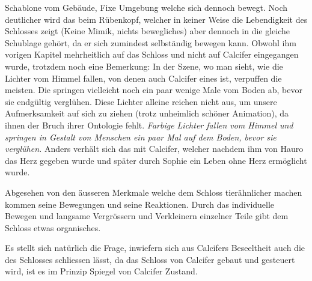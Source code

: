 Schablone vom Gebäude, Fixe Umgebung welche sich dennoch bewegt. Noch deutlicher wird das beim Rübenkopf, welcher in keiner Weise die Lebendigkeit des Schlosses zeigt (Keine Mimik, nichts bewegliches) aber dennoch in die gleiche Schublage gehört, da er sich zumindest selbständig bewegen kann.
Obwohl ihm vorigen Kapitel mehrheitlich auf das Schloss und nicht auf Calcifer eingegangen wurde, trotzdem noch eine Bemerkung: In der Szene, wo man sieht, wie die Lichter vom Himmel fallen, von denen auch Calcifer eines ist, verpuffen die meisten. Die springen vielleicht noch ein paar wenige Male vom Boden ab, bevor sie endgültig verglühen. Diese Lichter alleine reichen nicht aus, um unsere Aufmerksamkeit auf sich zu ziehen (trotz unheimlich schöner Animation), da ihnen der Bruch ihrer Ontologie fehlt. \emph{Farbige Lichter fallen vom Himmel und springen in Gestalt von Menschen ein paar Mal auf dem Boden, bevor sie verglühen.} Anders verhält sich das mit Calcifer, welcher nachdem ihm von Hauro das Herz gegeben wurde und später durch Sophie ein Leben ohne Herz ermöglicht wurde.

Abgesehen von den äusseren Merkmale welche dem Schloss tierähnlicher machen kommen seine Bewegungen und seine Reaktionen. Durch das individuelle Bewegen und langsame Vergrössern und Verkleinern einzelner Teile gibt dem Schloss etwas organisches. 

Es stellt sich natürlich die Frage, inwiefern sich aus Calcifers Beseeltheit auch die des Schlosses schliessen lässt, da das Schloss von Calcifer gebaut und gesteuert wird, ist es im Prinzip Spiegel von Calcifer Zustand.

